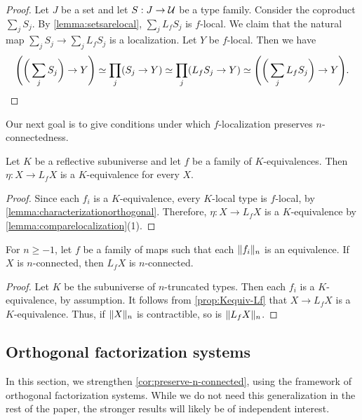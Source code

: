 \begin{proof}
    Let $J$ be a set and let $S : J \to \UU$ be a type family.
    Consider the coproduct $\sum_j S_j$.
    By \cref{lemma:setsarelocal}, $\sum_j L_f S_j$ is $f$-local. We claim that the natural
    map $\sum_j S_j \to \sum_j L_f S_j$ is a localization.
    Let $Y$ be $f$-local. Then we have
    \[
        \Bigg( \bigg( \sum_j S_j \bigg) \to Y \Bigg) \simeq \prod_j (S_j \to Y) \simeq
        \prod_j (L_f S_j \to Y) \simeq \Bigg( \bigg( \sum_j L_f S_j \bigg) \to Y \Bigg).\qedhere
    \]
\end{proof}

\medskip

Our next goal is to give conditions under which $f$-localization
preserves $n$-connected\-ness.

\begin{prop}\label{prop:Kequiv-Lf}
Let $K$ be a reflective subuniverse and let $f$ be a family of $K$-equiva\-lences.
Then $\eta : X \to L_f X$ is a $K$-equivalence for every $X$.
\end{prop}

\begin{proof}
Since each $f_i$ is a $K$-equivalence, every $K$-local type is $f$-local,
by \cref{lemma:characterizationorthogonal}.
Therefore, $\eta : X \to L_f X$ is a $K$-equivalence
by \cref{lemma:comparelocalization}(1).
\end{proof}

\begin{cor}\label{cor:preserve-n-connected}
For $n \geq -1$, let $f$ be a family of maps such that each $\trunc{n}{f_i}$ is an equivalence.
If $X$ is $n$-connected, then $L_f X$ is $n$-connected.
\end{cor}

\begin{proof}
Let $K$ be the subuniverse of $n$-truncated types.
Then each $f_i$ is a $K$-equivalence, by assumption.
It follows from \cref{prop:Kequiv-Lf} that $X \to L_f X$ is a $K$-equivalence.
Thus, if $\trunc{n}{X}$ is contractible, so is $\trunc{n}{L_f X}$.
\end{proof}

\subsection{Orthogonal factorization systems}\label{ss:orthogonal-factorization-systems}

In this section, we strengthen \cref{cor:preserve-n-connected}, using
the framework of orthogonal factorization systems.
While we do not need this generalization in the rest of the paper,
the stronger results will likely be of independent interest.

